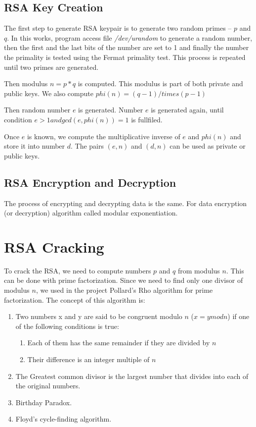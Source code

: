 \documentclass[11pt,a4paper,titlepage]{article}
\begin{document}
        \subsection{RSA Key Creation}
        \label{rsakey}
            The first step to generate RSA keypair is to generate two random primes -- $p$ and $q$. In this works, program access file \textit{/dev/urandom} to generate a random number, then the first and the last bits of the number are set to 1 and finally the number the primality is tested using the Fermat primality test. This process is repeated until two primes are generated.
            
            Then modulus $n = p * q$ is computed. This modulus is part of both private and public keys. We also compute $phi(n) = (q - 1) /times (p - 1)$
            
            Then random number $e$ is generated. Number $e$ is generated again, until condition $e > 1 and gcd(e, phi(n)) = 1$ is fullfiled.
            
            Once $e$ is known, we compute the multiplicative inverse of $e$ and $phi(n)$ and store it into number $d$. The pairs $(e, n)$ and $(d, n)$ can be used as private or public keys.
        
        \subsection{RSA Encryption and Decryption}
            \label{rsacryption}
            The process of encrypting and decrypting data is the same. For data encryption (or decryption) algorithm called modular exponentiation.
        
    \section{RSA Cracking}
        To crack the RSA, we need to compute numbers $p$ and $q$ from modulus $n$. This can be done with prime factorization. Since we need to find only one divisor of modulus $n$, we used in the project Pollard’s Rho algorithm for prime factorization. The concept of this algorithm is:
        \begin{enumerate}
            \item Two numbers x and y are said to be congruent modulo $n$ ($x = y mod n$) if one of the following conditions is true:
            \begin{enumerate}
                \item Each of them has the same remainder if they are divided by $n$
                \item Their difference is an integer multiple of $n$
            \end{enumerate}
            \item The Greatest common divisor is the largest number that divides into each of the original numbers.
            \item Birthday Paradox.
            \item Floyd’s cycle-finding algorithm.
        \end{enumerate}
        
\end{document}
